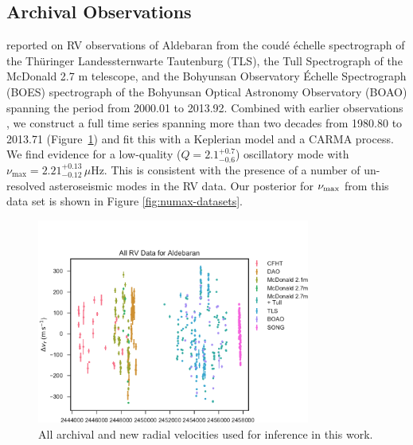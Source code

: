 \documentclass[modern]{aastex61}
\newcommand{\numax}{\mbox{$\nu_{\rm max}$}\xspace}
\newcommand{\twosidedrange}[3]{\ensuremath{#1^{+#2}_{-#3}}}
\newcommand{\HatzesQRange}{\twosidedrange{2.1}{0.7}{0.6}}
\newcommand{\HatzesNuMaxRange}{\twosidedrange{2.21}{0.13}{0.12}}
\begin{document}
\subsection{Archival Observations}
\label{sec:archival-obs}

\citet{Hatzes2015} reported on RV observations of Aldebaran from the coud\'{e}
\'{e}chelle spectrograph of the Th\"{u}ringer Landessternwarte Tautenburg (TLS),
the Tull Spectrograph of the McDonald 2.7 m telescope, and the Bohyunsan
Observatory \'{E}chelle Spectrograph (BOES) spectrograph of the Bohyunsan
Optical Astronomy Observatory (BOAO) spanning the period from 2000.01 to
2013.92.  Combined with earlier observations \citep{hatzes1993}, we construct a
full time series spanning more than two decades from 1980.80 to 2013.71
(Figure~\ref{alldata}) and fit this with a Keplerian model and a CARMA process.
We find evidence for a low-quality ($Q = \HatzesQRange{}$) oscillatory mode with
$\nu_\mathrm{max} = \HatzesNuMaxRange{} \, \mu\mathrm{Hz}$.  This is consistent
with the presence of a number of un-resolved asteroseismic modes in the RV data.
Our posterior for \numax{} from this data set is shown in Figure
\ref{fig:numax-datasets}.

\begin{figure}
\centering
\includegraphics[width=0.8\textwidth]{all-data.pdf}
\caption{All archival and new radial velocities used for inference in this work.}
\label{alldata}
\end{figure}
\end{document}
